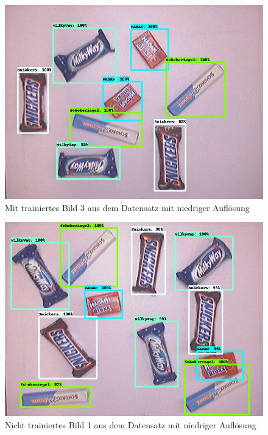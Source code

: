     \begin{figure}[H]
        \centering
        \includegraphics[angle = 90, width = \textwidth]{Bilder/models/model_comparison/ssd_mobilenet_v2_fpnlite_640x640_coco17_tpu-8/trained_3.jpg}
        \caption{Mit trainiertes Bild 3 aus dem Datensatz mit niedriger Auflösung}
    \end{figure}
    
    \begin{figure}[H]
        \centering
        \includegraphics[angle = 90, width = \textwidth]{Bilder/models/model_comparison/ssd_mobilenet_v2_fpnlite_640x640_coco17_tpu-8/non_trained_1.jpg}
        \caption{Nicht trainiertes Bild 1 aus dem Datensatz mit niedriger Auflösung}
    \end{figure}
    

